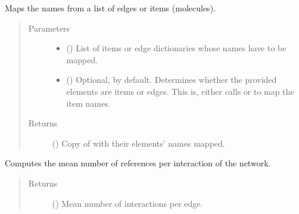 \documentclass[letterpaper,10pt,english]{sphinxmanual}
\begin{document}
\begin{fulllineitems}
\begin{fulllineitems}
\begin{quote}
\begin{description}
\end{description}\end{quote}

\end{fulllineitems}


\begin{fulllineitems}
\label{\detokenize{main:pypath.main.PyPath.map_list}}
Maps the names from a list of edges or items (molecules).
\begin{quote}\begin{description}
\item[{Parameters}] \leavevmode\begin{itemize}
\item {} 
 () \textendash{} List of items or edge dictionaries whose names have to be
mapped.

\item {} 
 () \textendash{} Optional,  by default. Determines whether the
provided elements are items or edges. This is, either calls
{\hyperref[\detokenize{main:pypath.main.PyPath.map_edge}]{}} or
{\hyperref[\detokenize{main:pypath.main.PyPath.map_item}]{}} to map the item
names.

\end{itemize}

\item[{Returns}] \leavevmode
() \textendash{} Copy of  with their elements’ names mapped.

\end{description}\end{quote}

\end{fulllineitems}


\begin{fulllineitems}
\label{\detokenize{main:pypath.main.PyPath.mean_reference_per_interaction}}
Computes the mean number of references per interaction of the
network.
\begin{quote}\begin{description}
\item[{Returns}] \leavevmode
() \textendash{} Mean number of interactions per edge.


\end{description}
\end{quote}
\end{fulllineitems}
\end{fulllineitems}
\end{document}
